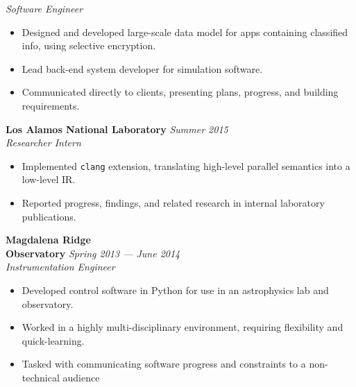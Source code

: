\documentclass{tc_cv}
\begin{document}
\begin{minipage}[t]{0.6\linewidth}
\textsl{Software Engineer}
\nopagebreak
\begin{itemize}
  \item Designed and developed large-scale data model for apps containing
    classified info, using selective encryption.
  \item Lead back-end system developer for simulation software.
  \item Communicated directly to clients, presenting plans, progress, and
    building requirements.
\end{itemize}
\vspace{1em}
\textbf{Los Alamos National Laboratory} \hfill \textsl{Summer 2015}\\
\textsl{Researcher Intern}
\nopagebreak
\begin{itemize}
  \item Implemented \texttt{clang} extension, translating high-level parallel
    semantics into a low-level IR.
  \item Reported progress, findings, and related research in internal
    laboratory publications.
\end{itemize}
\vspace{1em}
\textbf{Magdalena Ridge \\ Observatory} \hfill \textsl{Spring 2013 --- June 2014}\\
\textsl{Instrumentation Engineer}
\begin{itemize}
  \item Developed control software in Python for use in an astrophysics lab and
    observatory.
  \item Worked in a highly multi-disciplinary environment, requiring
    flexibility and quick-learning.
  \item Tasked with communicating software progress and constraints to a
    non-technical audience
\end{itemize}
\vspace{1em}
\end{minipage}
\end{document}
